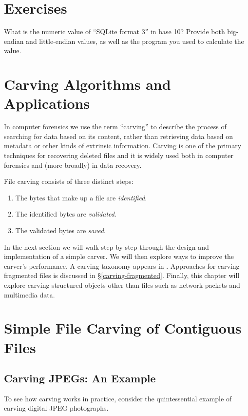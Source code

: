 \documentclass[11pt,letter]{article}
\newcommand{\secref}[1]{\S\ref{#1}}
\begin{document}
\section{Exercises}

What is the numeric value of ``SQLite format 3'' in base 10? Provide
both big-endian and little-endian values, as well as the  program you
used to calculate the value. 

\section{Carving Algorithms and Applications}
In computer forensics we use the term  ``carving'' to describe the
process of searching for data based on its content, rather than
retrieving data based on metadata or other kinds of extrinsic
information. Carving is one of the primary techniques for recovering deleted
files and it is widely used both in computer forensics and (more
broadly) in data recovery.

File carving consists of three distinct steps:
\begin{enumerate}
\renewcommand{\theenumi}{Step (\arabic{enumi})}
\item The bytes that make up a file are \emph{identified}.
\item The identified bytes are \emph{validated}.\label{step-validate}
\item The validated bytes are \emph{saved}.\label{step-save}
\end{enumerate}

In the next section we will walk step-by-step through the design and
implementation of a simple carver. We will then explore ways to
improve the carver's performance. A carving taxonomy appears in
. Approaches for carving fragmented files is
discussed in \secref{carving-fragmented}. Finally, this chapter will
explore carving structured objects other than files such as network
packets and multimedia data.

\section{Simple File Carving of Contiguous Files}
\subsection{Carving JPEGs: An Example}

To see how carving works in practice, consider the quintessential 
example of carving digital JPEG photographs.
\end{document}
